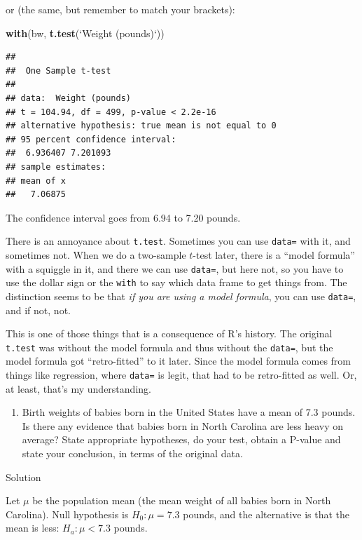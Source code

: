 \documentclass[]{tufte-book}
\newenvironment{Shaded}{}{}
\newcommand{\DataTypeTok}[1]{\textcolor[rgb]{0.56,0.13,0.00}{#1}}
\newcommand{\KeywordTok}[1]{\textcolor[rgb]{0.00,0.44,0.13}{\textbf{#1}}}
\newcommand{\NormalTok}[1]{#1}
\newcommand{\StringTok}[1]{\textcolor[rgb]{0.25,0.44,0.63}{#1}}
\providecommand{\tightlist}{%
  \setlength{\itemsep}{0pt}\setlength{\parskip}{0pt}}
\theoremstyle{definition}
\theoremstyle{definition}
\theoremstyle{definition}
\theoremstyle{remark}
\begin{document}
or (the same, but remember to match your brackets):

\begin{Shaded}
\begin{Highlighting}[]
\KeywordTok{with}\NormalTok{(bw, }\KeywordTok{t.test}\NormalTok{(}\StringTok{`}\DataTypeTok{Weight (pounds)}\StringTok{`}\NormalTok{))}
\end{Highlighting}
\end{Shaded}

\begin{verbatim}
## 
##  One Sample t-test
## 
## data:  Weight (pounds)
## t = 104.94, df = 499, p-value < 2.2e-16
## alternative hypothesis: true mean is not equal to 0
## 95 percent confidence interval:
##  6.936407 7.201093
## sample estimates:
## mean of x 
##   7.06875
\end{verbatim}

The confidence interval goes from 6.94 to 7.20 pounds.

There is an annoyance about \texttt{t.test}. Sometimes you can use
\texttt{data=} with it, and sometimes not. When we do a two-sample
\(t\)-test later, there is a ``model formula'' with a squiggle in it,
and there we can use \texttt{data=}, but here not, so you have to use
the dollar sign or the \texttt{with} to say which data frame to get
things from. The distinction seems to be that \emph{if you are using a
model formula}, you can use \texttt{data=}, and if not, not.

This is one of those things that is a consequence of R's history. The
original \texttt{t.test} was without the model formula and thus without
the \texttt{data=}, but the model formula got ``retro-fitted'' to it
later. Since the model formula comes from things like regression, where
\texttt{data=} is legit, that had to be retro-fitted as well. Or, at
least, that's my understanding.

\begin{enumerate}
\def\labelenumi{(\alph{enumi})}
\setcounter{enumi}{2}
\tightlist
\item
  Birth weights of babies born in the United States have a mean of 7.3
  pounds. Is there any evidence that babies born in North Carolina are
  less heavy on average? State appropriate hypotheses, do your test,
  obtain a P-value and state your conclusion, in terms of the original
  data.
\end{enumerate}

Solution

Let \(\mu\) be the population mean (the mean weight of all babies born
in North Carolina). Null hypothesis is \(H_0: \mu=7.3\) pounds, and the
alternative is that the mean is less: \(H_a: \mu<7.3\) pounds.
\end{document}
